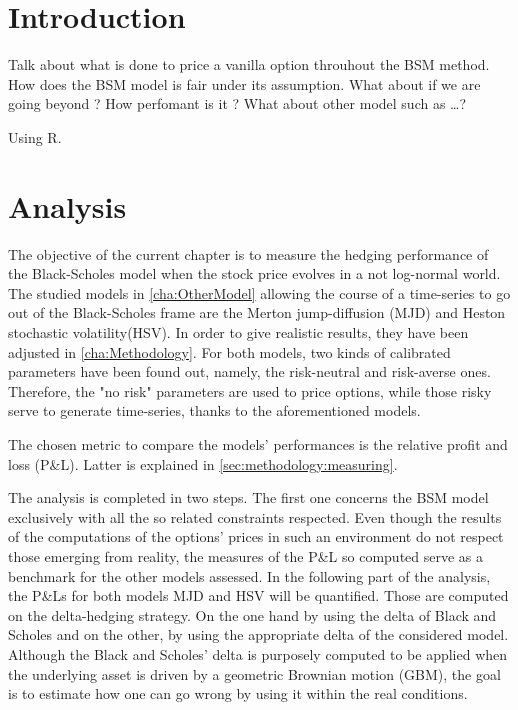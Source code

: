 \documentclass[12pt]{report}
\begin{document}

\tableofcontents{}



%
%
\chapter*{Introduction}
\label{cha:Introduction}

Talk about what is done to price a vanilla option throuhout the BSM method.
How does the BSM model is fair under its assumption. What about if we are going beyond ?
How perfomant is it ? 
What about other model such as \ldots ?

Using R. \cite{R}
\chapter{Analysis}
\label{cha:analysis}

The objective of the current chapter is to measure the hedging performance of the Black-Scholes model when the stock price evolves in a not log-normal world.
The studied models in \cref{cha:OtherModel} allowing the course of a time-series to go out of the Black-Scholes frame are the Merton jump-diffusion (MJD) and Heston stochastic volatility(HSV).
In order to give realistic results, they have been adjusted in \cref{cha:Methodology}. 
For both models, two kinds of calibrated parameters have been found out, namely, the risk-neutral and risk-averse ones. 
Therefore, the "no risk" parameters are used to price options, while those risky serve to generate time-series, thanks to the aforementioned models.

The chosen metric to compare the models' performances is the relative profit and loss (P\&L). Latter is explained in \cref{sec:methodology:measuring}.

The analysis is completed in two steps. The first one concerns the BSM model exclusively with all the so related constraints respected. Even though the results of the computations of the options' prices in such an environment do not respect those emerging from reality, the measures of the P\&L so computed serve as a benchmark for the other models assessed.
In the following part of the analysis, the P\&Ls for both models MJD and HSV will be quantified. Those are computed on the delta-hedging strategy. On the one hand by using the delta of Black and Scholes and on the other, by using the appropriate delta of the considered model.
Although the Black and Scholes' delta is purposely computed to be applied when the underlying asset is driven by a geometric Brownian motion (GBM), the goal is to estimate how one can go wrong by using it within the real conditions.
\end{document}
